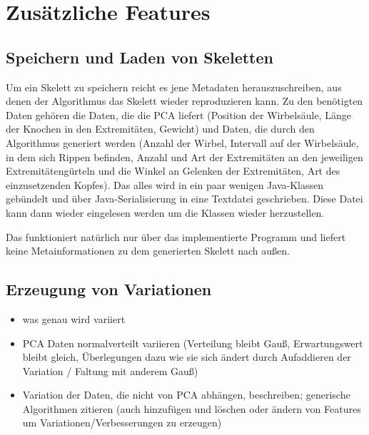 \chapter{Zusätzliche Features}
\label{chapter:additional_features}

\section{Speichern und Laden von Skeletten}

Um ein Skelett zu speichern reicht es jene Metadaten herauszuschreiben, aus denen der Algorithmus das Skelett wieder reproduzieren kann. Zu den benötigten Daten gehören die Daten, die die PCA liefert (Position der Wirbelsäule, Länge der Knochen in den Extremitäten, Gewicht) und Daten, die durch den Algorithmus generiert werden (Anzahl der Wirbel, Intervall auf der Wirbelsäule, in dem sich Rippen befinden, Anzahl und Art der Extremitäten an den jeweiligen Extremitätengürteln und die Winkel an Gelenken der Extremitäten, Art des einzusetzenden Kopfes).
Das alles wird in ein paar wenigen Java-Klassen gebündelt und über Java-Serialisierung in eine Textdatei geschrieben. Diese Datei kann dann wieder eingelesen werden um die Klassen wieder herzustellen.

Das funktioniert natürlich nur über das implementierte Programm und liefert keine Metainformationen zu dem generierten Skelett nach außen.


\section{Erzeugung von Variationen}

\begin{itemize}
 \item was genau wird variiert
 \item PCA Daten normalverteilt variieren (Verteilung bleibt Gauß, Erwartungswert bleibt gleich, Überlegungen dazu wie sie sich ändert durch Aufaddieren der Variation / Faltung mit anderem Gauß)
 \item Variation der Daten, die nicht von PCA abhängen, beschreiben; generische Algorithmen zitieren (auch hinzufügen und löschen oder ändern von Features um Variationen/Verbesserungen zu erzeugen)
\end{itemize}


